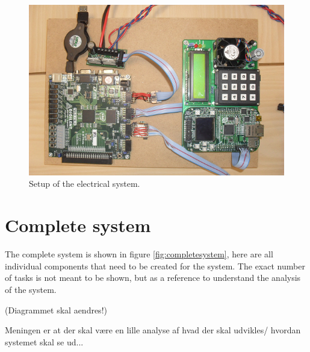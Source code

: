 \begin{figure}[htb]
	\centering
	\includegraphics[width=\textwidth,trim=0 0 0 0]{graphics/digitalsystem.png} %
	\caption{Setup of the electrical system.}
	\label{fig:digitalsystem}			%
\end{figure}

\section{Complete system}

The complete system is shown in figure \ref{fig:completesystem}, here are all individual components that need to be created for the system. The exact number of tasks is not meant to be shown, but as a reference to understand the analysis of the system.

(Diagrammet skal aendres!)

Meningen er at der skal være en lille analyse af hvad der skal udvikles/ hvordan systemet skal se ud...


